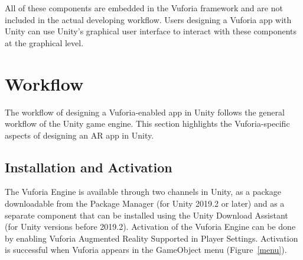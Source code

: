All of these components are embedded in the Vuforia framework and are not included in the actual developing workflow. Users designing a Vuforia app with Unity can use Unity's graphical user interface to interact with these components at the graphical level.

\section{Workflow}\label{workflow}
The workflow of designing a Vuforia-enabled app in Unity follows the general workflow of the Unity game engine. This section highlights the Vuforia-specific aspects of designing an AR app in Unity.

\subsection{Installation and Activation}
The Vuforia Engine is available through two channels in Unity, as a package downloadable from the Package Manager (for Unity 2019.2 or later) and as a separate component that can be installed using the Unity Download Assistant (for Unity versions before 2019.2). Activation of the Vuforia Engine can be done by enabling Vuforia Augmented Reality Supported in Player Settings. Activation is successful when Vuforia appears in the GameObject menu (Figure~\ref{menu}).

\begin{figure}[!ht]
\end{figure}

